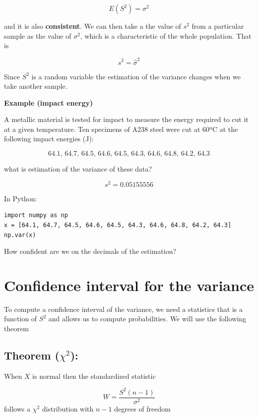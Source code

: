 \documentclass[
]{book}
\begin{document}
\[E(S^2)=\sigma^2\]

and it is also \textbf{consistent}. We can then take a the value of \(s^2\) from a particular sample as the value of \(\sigma^2\), which is a characteristic of the whole population. That is

\[s^2=\hat{\sigma}^2\]

Since \(S^2\) is a random variable the estimation of the variance changes when we take another sample.

\textbf{Example (impact energy)}

A metallic material is tested for impact to measure the energy required to cut it at a given temperature. Ten specimens of A238 steel were cut at 60ºC at the following impact energies (J):

\[64.1,\, 64.7,\, 64.5,\, 64.6,\, 64.5,\, 64.3,\, 64.6,\, 64.8,\, 64.2,\, 64.3\]

what is estimation of the variance of these data?

\[s^2=0.05155556\]

In Python:

\begin{verbatim}
import numpy as np
x = [64.1, 64.7, 64.5, 64.6, 64.5, 64.3, 64.6, 64.8, 64.2, 64.3]
np.var(x)
\end{verbatim}

How confident are we on the decimals of the estimation?

\hypertarget{confidence-interval-for-the-variance}{%
\section{Confidence interval for the variance}\label{confidence-interval-for-the-variance}}

To compute a confidence interval of the variance, we need a statistics that is a function of \(S^2\) and allows us to compute probabilities. We will use the following theorem

\hypertarget{theorem-chi2}{%
\subsection{\texorpdfstring{Theorem (\(\chi^2\)):}{Theorem (\textbackslash chi\^{}2):}}\label{theorem-chi2}}

When \(X\) is normal then the standardized statistic

\[W=\frac{S^2(n-1)}{\sigma^2}\]
follows a \(\chi^2\) distribution with \(n-1\) degrees of freedom
\end{document}
